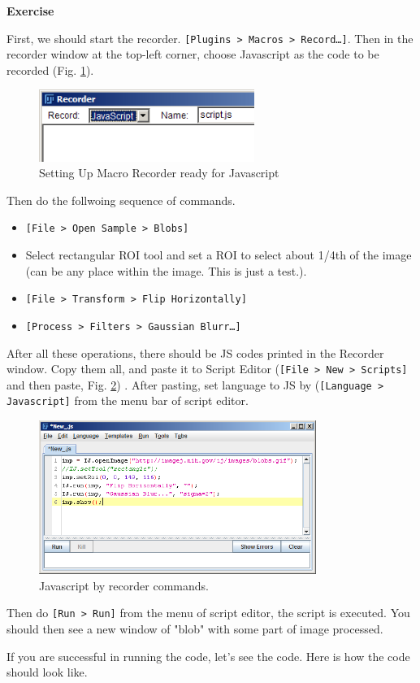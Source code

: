 \documentclass[11pt,a4paper,oneside]{report}
\newenvironment{indentexercise}[1]%
{{\setlength{\leftmargin}{2em}}%
\textbf{Exercise \thesubsection-#1}%
\begin{list}{}%
	\item%
}
{\end{list}}
\newcommand{\ijmenu}[1]{\texttt{\small#1}}
\newcommand{\ilcom}[1]{\texttt{\small#1}}
\begin{document}
\begin{indentexercise}{1}
First, we should start the recorder. \ijmenu{[Plugins > Macros > Record\dots]}. Then in the recorder window at the top-left corner, choose Javascript as the code to be recorded (Fig. \ref{fig:MacroRecorderJS}). 

\begin{figure}[htbp]
\begin{center}
\includegraphics[width=70mm]{fig2/RecorderJS.png}
\caption{Setting Up Macro Recorder ready for Javascript}
\label{fig:MacroRecorderJS}
\end{center}
\end{figure}

Then do the follwoing sequence of commands.
\begin{itemize}
\item \ijmenu{[File > Open Sample > Blobs]}
\item Select rectangular ROI tool and set a ROI to select about 1/4th of the image (can be any place within the image. This is just a test.). 
\item \ijmenu{[File > Transform > Flip Horizontally]}
\item \ijmenu{[Process > Filters > Gaussian Blurr\dots]}
\end{itemize}
After all these operations, there should be JS codes printed in the Recorder window. Copy them all, and paste it to Script Editor (\ilcom{[File > New > Scripts]} and then paste, Fig. \ref{fig:ScriptEditorRecorded}) . After pasting, set language to JS by (\ilcom{[Language > Javascript]} from the menu bar of script editor.  

\begin{figure}[htbp]
\begin{center}
\includegraphics[height=50mm]{fig2/JSrecordedInScriptEditor.png}
\caption{Javascript by recorder commands.}
\label{fig:ScriptEditorRecorded}
\end{center}
\end{figure}

Then do \ilcom{[Run > Run]} from the menu of script editor, the script is executed. You should then see a new window of "blob" with some part of image processed. 
\end{indentexercise}
If you are successful in running the code, let's see the code. Here is how the code should look like. 
\end{document}
